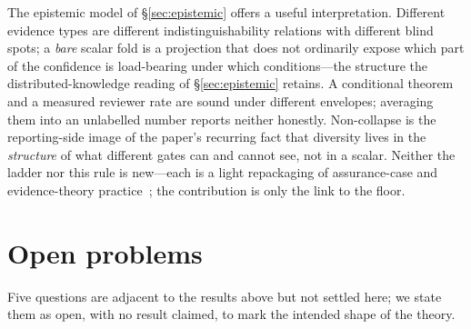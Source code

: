 \documentclass[11pt]{article}
\theoremstyle{definition}
\theoremstyle{remark}
\begin{document}
The epistemic model of \S\ref{sec:epistemic} offers a useful interpretation. Different evidence types
are different indistinguishability relations with different blind spots; a \emph{bare} scalar fold is a
projection that does not ordinarily expose which part of the confidence is load-bearing under which
conditions---the structure the distributed-knowledge reading of \S\ref{sec:epistemic} retains.
A conditional theorem and a measured reviewer rate are sound under different
envelopes; averaging them into an unlabelled number reports neither honestly. Non-collapse is the reporting-side image of the
paper's recurring fact that diversity lives in the \emph{structure} of what different gates can and
cannot see, not in a scalar. Neither the ladder nor this rule is new---each is a light repackaging of
assurance-case and evidence-theory practice~\cite{mankins1995,gsn,shafer1976}; the contribution is only
the link to the floor.

\section{Open problems}\label{sec:open}
Five questions are adjacent to the results above but not settled here; we state them as open, with no
result claimed, to mark the intended shape of the theory.
\end{document}
